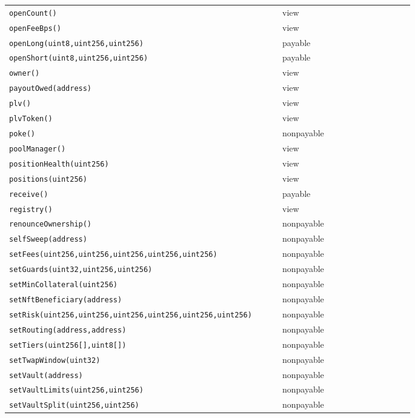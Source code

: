 \begin{longtable}{@{}p{0.62\linewidth}p{0.30\linewidth}@{}}
\texttt{\scriptsize openCount()} & view \\
\texttt{\scriptsize openFeeBps()} & view \\
\texttt{\scriptsize openLong(uint8,uint256,uint256)} & payable \\
\texttt{\scriptsize openShort(uint8,uint256,uint256)} & payable \\
\texttt{\scriptsize owner()} & view \\
\texttt{\scriptsize payoutOwed(address)} & view \\
\texttt{\scriptsize plv()} & view \\
\texttt{\scriptsize plvToken()} & view \\
\texttt{\scriptsize poke()} & nonpayable \\
\texttt{\scriptsize poolManager()} & view \\
\texttt{\scriptsize positionHealth(uint256)} & view \\
\texttt{\scriptsize positions(uint256)} & view \\
\texttt{\scriptsize receive()} & payable \\
\texttt{\scriptsize registry()} & view \\
\texttt{\scriptsize renounceOwnership()} & nonpayable \\
\texttt{\scriptsize selfSweep(address)} & nonpayable \\
\texttt{\scriptsize setFees(uint256,uint256,uint256,uint256,uint256)} & nonpayable \\
\texttt{\scriptsize setGuards(uint32,uint256,uint256)} & nonpayable \\
\texttt{\scriptsize setMinCollateral(uint256)} & nonpayable \\
\texttt{\scriptsize setNftBeneficiary(address)} & nonpayable \\
\texttt{\scriptsize setRisk(uint256,uint256,uint256,uint256,uint256,uint256)} & nonpayable \\
\texttt{\scriptsize setRouting(address,address)} & nonpayable \\
\texttt{\scriptsize setTiers(uint256[],uint8[])} & nonpayable \\
\texttt{\scriptsize setTwapWindow(uint32)} & nonpayable \\
\texttt{\scriptsize setVault(address)} & nonpayable \\
\texttt{\scriptsize setVaultLimits(uint256,uint256)} & nonpayable \\
\texttt{\scriptsize setVaultSplit(uint256,uint256)} & nonpayable \\

\end{longtable}

